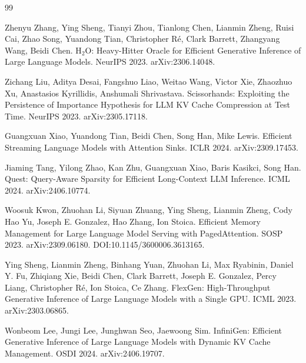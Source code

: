 \documentclass[11pt]{article}
\begin{document}
\begin{thebibliography}{99}

 Zhenyu Zhang, Ying Sheng, Tianyi Zhou, Tianlong Chen, Lianmin Zheng, Ruisi Cai, Zhao Song, Yuandong Tian, Christopher R\'e, Clark Barrett, Zhangyang Wang, Beidi Chen. H$_2$O: Heavy-Hitter Oracle for Efficient Generative Inference of Large Language Models. NeurIPS 2023. arXiv:2306.14048.

 Zichang Liu, Aditya Desai, Fangshuo Liao, Weitao Wang, Victor Xie, Zhaozhuo Xu, Anastasios Kyrillidis, Anshumali Shrivastava. Scissorhands: Exploiting the Persistence of Importance Hypothesis for LLM KV Cache Compression at Test Time. NeurIPS 2023. arXiv:2305.17118.

 Guangxuan Xiao, Yuandong Tian, Beidi Chen, Song Han, Mike Lewis. Efficient Streaming Language Models with Attention Sinks. ICLR 2024. arXiv:2309.17453.

 Jiaming Tang, Yilong Zhao, Kan Zhu, Guangxuan Xiao, Baris Kasikci, Song Han. Quest: Query-Aware Sparsity for Efficient Long-Context LLM Inference. ICML 2024. arXiv:2406.10774.

 Woosuk Kwon, Zhuohan Li, Siyuan Zhuang, Ying Sheng, Lianmin Zheng, Cody Hao Yu, Joseph E. Gonzalez, Hao Zhang, Ion Stoica. Efficient Memory Management for Large Language Model Serving with PagedAttention. SOSP 2023. arXiv:2309.06180. DOI:10.1145/3600006.3613165.

 Ying Sheng, Lianmin Zheng, Binhang Yuan, Zhuohan Li, Max Ryabinin, Daniel Y. Fu, Zhiqiang Xie, Beidi Chen, Clark Barrett, Joseph E. Gonzalez, Percy Liang, Christopher R\'e, Ion Stoica, Ce Zhang. FlexGen: High-Throughput Generative Inference of Large Language Models with a Single GPU. ICML 2023. arXiv:2303.06865.

 Wonbeom Lee, Jungi Lee, Junghwan Seo, Jaewoong Sim. InfiniGen: Efficient Generative Inference of Large Language Models with Dynamic KV Cache Management. OSDI 2024. arXiv:2406.19707.


\end{thebibliography}
\end{document}
